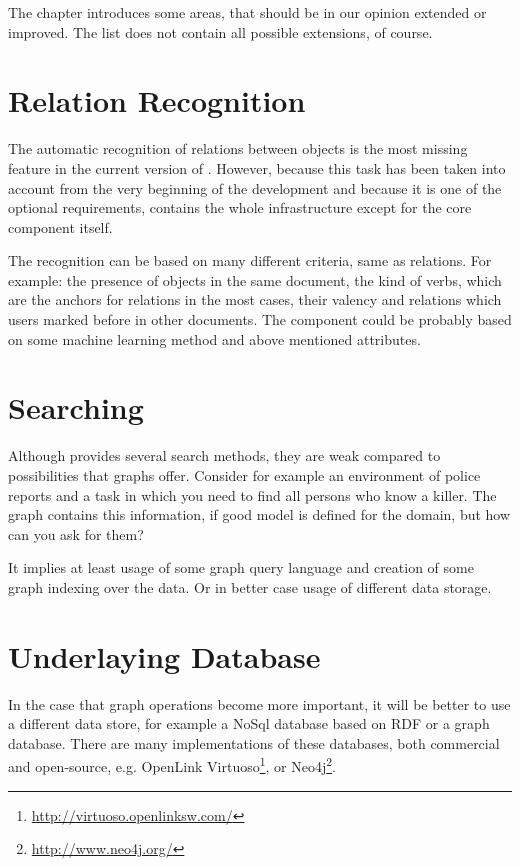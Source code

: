 
The chapter introduces some areas, that should be in our opinion extended or
improved. The list does not contain all possible extensions, of course.

\section{Relation Recognition}
The automatic recognition of relations between objects is the most missing
feature in the current version of \textan{}. However, because this task has been
taken into account from the very beginning of the development and because it is
one of the optional requirements, \textan{} contains the whole infrastructure
except for the core component itself.

The recognition can be based on many different criteria, same as relations.
For example: the presence of objects in the same document, the kind of verbs,
which are the anchors for relations in the most cases, their valency and
relations which users marked before in other documents. The component could be
probably based on some machine learning method and above mentioned attributes.

\section{Searching}
Although \textan{} provides several search methods, they are weak compared to
possibilities that graphs offer. Consider for example an environment of police
reports and a task in which you need to find all persons who know a killer. The
graph contains this information, if good model is defined for the domain, but
how can you ask for them?

It implies at least usage of some graph query language and creation of some
graph indexing over the data. Or in better case usage of different data storage. 

\section{Underlaying Database}
In the case that graph operations become more important, it will be better to
use a different data store, for example a NoSql database based on RDF or a graph
database. There are many implementations of these databases, both commercial and
open-source, e.g. OpenLink Virtuoso\footnote{\url{http://virtuoso.openlinksw.com/}},
or Neo4j\footnote{\url{http://www.neo4j.org/}}.

